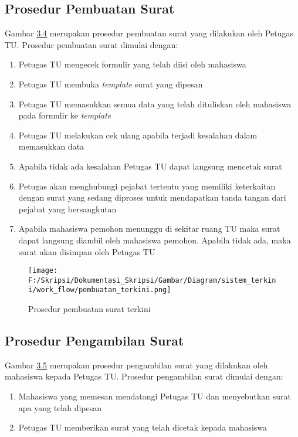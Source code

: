 \subsection{Prosedur Pembuatan Surat}
\label{sec:prosedur_pembuatan_surat}
Gambar \hyperlink{pembuatan_terkini}{3.4} merupakan prosedur pembuatan surat yang dilakukan oleh Petugas TU. Prosedur pembuatan surat dimulai dengan:
\begin{enumerate}
	\item Petugas TU mengecek formulir yang telah diisi oleh mahasiswa
	\item Petugas TU membuka \textit{template} surat yang dipesan
	\item Petugas TU memasukkan semua data yang telah dituliskan oleh mahasiswa pada formulir ke \textit{template}
	\item Petugas TU melakukan cek ulang apabila terjadi kesalahan dalam memasukkan data
	\item Apabila tidak ada kesalahan Petugas TU dapat langsung mencetak surat
	\item Petugas akan menghubungi pejabat tertentu yang memiliki keterkaitan dengan surat yang sedang diproses untuk mendapatkan tanda tangan dari pejabat yang bersangkutan
	\item Apabila mahasiswa pemohon menunggu di sekitar ruang TU maka surat dapat langsung diambil oleh mahasiswa pemohon. Apabila tidak ada, maka surat akan disimpan oleh Petugas TU
\end{enumerate}

\begin{figure}[H]
	\centering
		\texttt{[image: F:/Skripsi/Dokumentasi\_Skripsi/Gambar/Diagram/sistem\_terkini/work\_flow/pembuatan\_terkini.png]}
	{\caption{Prosedur pembuatan surat terkini}}
	\label{fig:pembuatan_terkini}
\end{figure}

\subsection{Prosedur Pengambilan Surat}
\label{sec:prosedur_pengambilan_surat}
Gambar \hyperlink{pengambilan_terkini}{3.5} merupakan prosedur pengambilan surat yang dilakukan oleh mahasiswa kepada Petugas TU. Prosedur pengambilan surat dimulai dengan:
\begin{enumerate}
	\item Mahasiswa yang memesan mendatangi Petugas TU dan menyebutkan surat apa yang telah dipesan
	\item Petugas TU memberikan surat yang telah dicetak kepada mahasiswa
\end{enumerate}


